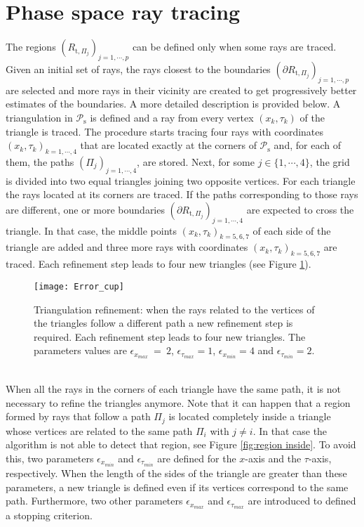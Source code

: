 \section{Phase space ray tracing}
The regions $(R_{\textrm{t}, \Pi_j})_{j =1, \cdots, p}$ can be defined only when some rays are traced.
Given an initial set of rays, the rays closest to the boundaries $(\partial R_{\textrm{t}, \Pi_j})_{j = 1, \cdots, p}$ are selected and more rays in their vicinity are created to get progressively better estimates of the boundaries. A more detailed description is provided below.
A triangulation in $\mathcal{P}_\textrm{s}$ is defined and a ray from every vertex $(x_k, \tau_k)$ of the triangle is traced.
The procedure starts tracing four rays with coordinates $(x_k,\tau_k)_{k=1, \cdots, 4}$ that are located exactly at the corners of $\mathcal{P}_\textrm{s}$ and, for each of them, the paths $(\Pi_{j})_{j = 1, \cdots, 4}$, are stored. Next, for some $j \in\{1, \cdots, 4\}$, the grid is divided into two equal triangles joining two opposite vertices. For each triangle the rays located at its corners are traced. If the paths corresponding to
those rays are different, one or more boundaries
$(\partial R_{\textrm{t}, \Pi_j})_{j =1, \cdots, 4}$ are expected to cross the triangle.
In that case, the middle points $(x_k, \tau_k)_{k = 5, 6, 7}$ of each side of the triangle are added and
three more rays with coordinates $(x_k, \tau_k)_{k = 5, 6,7}$ are traced. Each refinement step leads to four new triangles (see Figure \ref{fig:refinement}).
 \begin{figure}[htp]
  \begin{center}
  \texttt{[image: Error\_cup]}
  \end{center}
  \caption{\footnotesize{Triangulation refinement:
  when the rays related to the vertices of the triangles follow a different path a new refinement step is required.
   Each refinement step leads to four new triangles.
   The parameters values are $\epsilon_{x_{max}}~=~ 2$, $\epsilon_{\tau_{max}}= 1$, $\epsilon_{x_{min}}= 4$ and $\epsilon_{\tau_{min}}=2$.   }}
  \label{fig:refinement}
\end{figure}
  \\
 \indent
When all the rays in the corners of each triangle have the same path, it is not necessary to refine the triangles anymore.
\noindent Note that it can happen that a region formed by rays that follow a path $\Pi_j$ is located completely inside a triangle whose vertices are related to the same path $\Pi_i$ with $j \neq i$. In that case the algorithm is not able to detect that region, see Figure \ref{fig:region inside}. To avoid this, two parameters $\epsilon_{x_{min}}$ and $\epsilon_{\tau_{min}}$ are defined for the $x$-axis and the $\tau$-axis, respectively. When the length of the sides of the triangle are greater than these parameters, a new triangle is defined even if its vertices correspond to the same path. Furthermore, two other parameters $\epsilon_{x_{max}}$ and $\epsilon_{\tau_{max}}$ are introduced to defined a stopping criterion.
